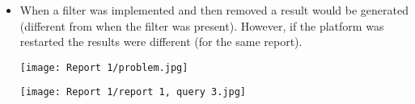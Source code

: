 \begin{itemize}
\begin{center}
\end{center}
\item When a filter was implemented and then removed a result would be generated (different from when the filter was present). However, if the platform was restarted the results were different (for the same report).
\begin{center}
  \texttt{[image: Report 1/problem.jpg]}
\end{center}
\begin{center}
  \texttt{[image: Report 1/report 1, query 3.jpg]}
\end{center}

\end{itemize}

